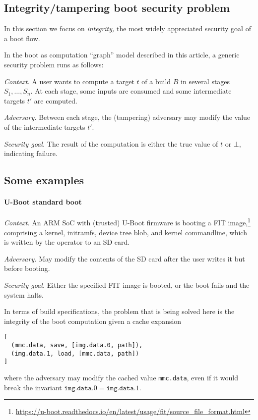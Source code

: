 \subsection{Integrity/tampering boot security problem}

In this section we focus on \emph{integrity,} the most widely
appreciated security goal of a boot flow.

In the boot as computation ``graph'' model described in this article, a
generic security problem runs as follows:

\emph{Context.} A user wants to compute a target \(t\) of a build \(B\)
in several stages \(S_1,\ldots,S_n\). At each stage, some inputs are
consumed and some intermediate targets \(t'\) are computed.

\emph{Adversary.} Between each stage, the (tampering) adversary may
modify the value of the intermediate targets \(t'\).

\emph{Security goal.} The result of the computation is either the true
value of \(t\) or \(\bot\), indicating failure.


\subsection{Some examples}

\paragraph{U-Boot standard boot}

\emph{Context.} An ARM SoC with (trusted) U-Boot firmware is booting a FIT
image,\footnote{\url{https://u-boot.readthedocs.io/en/latest/usage/fit/source_file_format.html}} comprising a kernel, initramfs, device tree blob, and kernel
commandline, which is written by the operator to an SD card.

\emph{Adversary.} May modify the contents of the SD card after the user writes it but before booting.

\emph{Security goal.} Either the specified FIT image is booted, or the boot fails and the system halts.


In terms of build specifications, the problem that is being solved here is the integrity of the boot computation given a cache expansion
\begin{verbatim}
[
  (mmc.data, save, [img.data.0, path]),
  (img.data.1, load, [mmc.data, path])
]
\end{verbatim}
where the adversary may modify the cached value \texttt{mmc.data}, even if it would break the invariant $\mathtt{img.data.0} = \mathtt{img.data.1}$.

